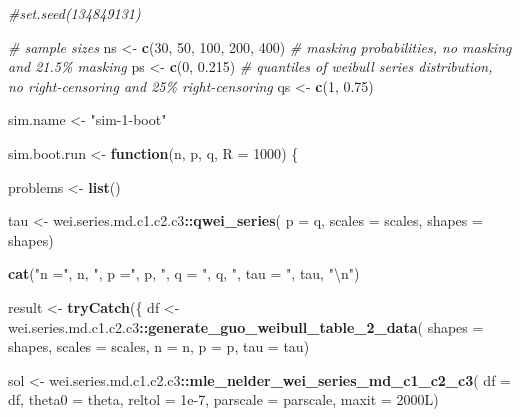 \documentclass[
]{article}
\newenvironment{Shaded}{\begin{snugshade}}{\end{snugshade}}
\newcommand{\CharTok}[1]{\textcolor[rgb]{0.31,0.60,0.02}{#1}}
\newcommand{\CommentTok}[1]{\textcolor[rgb]{0.56,0.35,0.01}{\textit{#1}}}
\newcommand{\ControlFlowTok}[1]{\textcolor[rgb]{0.13,0.29,0.53}{\textbf{#1}}}
\newcommand{\DataTypeTok}[1]{\textcolor[rgb]{0.13,0.29,0.53}{#1}}
\newcommand{\DecValTok}[1]{\textcolor[rgb]{0.00,0.00,0.81}{#1}}
\newcommand{\FloatTok}[1]{\textcolor[rgb]{0.00,0.00,0.81}{#1}}
\newcommand{\KeywordTok}[1]{\textcolor[rgb]{0.13,0.29,0.53}{\textbf{#1}}}
\newcommand{\NormalTok}[1]{#1}
\newcommand{\OperatorTok}[1]{\textcolor[rgb]{0.81,0.36,0.00}{\textbf{#1}}}
\newcommand{\StringTok}[1]{\textcolor[rgb]{0.31,0.60,0.02}{#1}}
\begin{document}
\begin{Shaded}
\begin{Highlighting}[]
\CommentTok{\#set.seed(134849131)}

\CommentTok{\# sample sizes}
\NormalTok{ns \textless{}{-}}\StringTok{ }\KeywordTok{c}\NormalTok{(}\DecValTok{30}\NormalTok{, }\DecValTok{50}\NormalTok{, }\DecValTok{100}\NormalTok{, }\DecValTok{200}\NormalTok{, }\DecValTok{400}\NormalTok{)}
\CommentTok{\# masking probabilities, no masking and 21.5\% masking}
\NormalTok{ps \textless{}{-}}\StringTok{ }\KeywordTok{c}\NormalTok{(}\DecValTok{0}\NormalTok{, }\FloatTok{0.215}\NormalTok{)}
\CommentTok{\# quantiles of weibull series distribution, no right{-}censoring and 25\% right{-}censoring}
\NormalTok{qs \textless{}{-}}\StringTok{ }\KeywordTok{c}\NormalTok{(}\DecValTok{1}\NormalTok{, }\FloatTok{0.75}\NormalTok{)}

\NormalTok{sim.name \textless{}{-}}\StringTok{ "sim{-}1{-}boot"}

\NormalTok{sim.boot.run \textless{}{-}}\StringTok{ }\ControlFlowTok{function}\NormalTok{(n, p, q, }\DataTypeTok{R =} \DecValTok{1000}\NormalTok{) \{}

\NormalTok{    problems \textless{}{-}}\StringTok{ }\KeywordTok{list}\NormalTok{()}

\NormalTok{    tau \textless{}{-}}\StringTok{ }\NormalTok{wei.series.md.c1.c2.c3}\OperatorTok{::}\KeywordTok{qwei\_series}\NormalTok{(}
        \DataTypeTok{p =}\NormalTok{ q, }\DataTypeTok{scales =}\NormalTok{ scales, }\DataTypeTok{shapes =}\NormalTok{ shapes)}

    \KeywordTok{cat}\NormalTok{(}\StringTok{"n ="}\NormalTok{, n, }\StringTok{", p ="}\NormalTok{, p, }\StringTok{", q = "}\NormalTok{, q, }\StringTok{", tau = "}\NormalTok{, tau, }\StringTok{"}\CharTok{\textbackslash{}n}\StringTok{"}\NormalTok{)}
  
\NormalTok{    result \textless{}{-}}\StringTok{ }\KeywordTok{tryCatch}\NormalTok{(\{}
\NormalTok{        df \textless{}{-}}\StringTok{ }\NormalTok{wei.series.md.c1.c2.c3}\OperatorTok{::}\KeywordTok{generate\_guo\_weibull\_table\_2\_data}\NormalTok{(}
            \DataTypeTok{shapes =}\NormalTok{ shapes,}
            \DataTypeTok{scales =}\NormalTok{ scales,}
            \DataTypeTok{n =}\NormalTok{ n,}
            \DataTypeTok{p =}\NormalTok{ p,}
            \DataTypeTok{tau =}\NormalTok{ tau)}

\NormalTok{        sol \textless{}{-}}\StringTok{ }\NormalTok{wei.series.md.c1.c2.c3}\OperatorTok{::}\KeywordTok{mle\_nelder\_wei\_series\_md\_c1\_c2\_c3}\NormalTok{(}
            \DataTypeTok{df =}\NormalTok{ df,}
            \DataTypeTok{theta0 =}\NormalTok{ theta,}
            \DataTypeTok{reltol =} \FloatTok{1e{-}7}\NormalTok{,}
            \DataTypeTok{parscale =}\NormalTok{ parscale,}
            \DataTypeTok{maxit =}\NormalTok{ 2000L)}


\end{Highlighting}
\end{Shaded}
\end{document}
